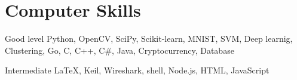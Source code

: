 \documentclass{tccv}
\begin{document}
\section{Computer Skills}
\begin{factlist}

\item{Good level}
     {Python, OpenCV, SciPy, Scikit-learn, MNIST, SVM, Deep learnig, Clustering, Go, C, C++, C\#, Java, Cryptocurrency, Database}


\item{Intermediate}
     {\LaTeX, Keil, Wireshark, shell, Node.js, HTML, JavaScript}


\end{factlist}

\end{document}
